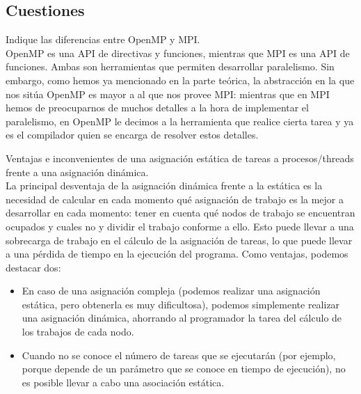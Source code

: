 \subsection{Cuestiones}
\begin{cuestion}
    Indique las diferencias entre OpenMP y MPI.\\

    OpenMP es una API de directivas y funciones, mientras que MPI es una API de funciones. Ambas son herramientas que permiten desarrollar paralelismo. Sin embargo, como hemos ya mencionado en la parte teórica, la abstracción en la que nos sitúa OpenMP es mayor a al que nos provee MPI: mientras que en MPI hemos de preocuparnos de muchos detalles a la hora de implementar el paralelismo, en OpenMP le decimos a la herramienta que realice cierta tarea y ya es el compilador quien se encarga de resolver estos detalles.
\end{cuestion}

\begin{cuestion}
    Ventajas e inconvenientes de una asignación estática de tareas a procesos/threads frente a una asignación dinámica.\\

    La principal desventaja de la asignación dinámica frente a la estática es la necesidad de calcular en cada momento qué asignación de trabajo es la mejor a desarrollar en cada momento: tener en cuenta qué nodos de trabajo se encuentran ocupados y cuales no y dividir el trabajo conforme a ello.
    Esto puede llevar a una sobrecarga de trabajo en el cálculo de la asignación de tareas, lo que puede llevar a una pérdida de tiempo en la ejecución del programa. Como ventajas, podemos destacar dos:
    \begin{itemize}
        \item En caso de una asignación compleja (podemos realizar una asignación estática, pero obtenerla es muy dificultosa), podemos simplemente realizar una asignación dinámica, ahorrando al programador la tarea del cálculo de los trabajos de cada nodo.
        \item Cuando no se conoce el número de tareas que se ejecutarán (por ejemplo, porque depende de un parámetro que se conoce en tiempo de ejecución), no es posible llevar a cabo una asociación estática.
    \end{itemize}
\end{cuestion}

